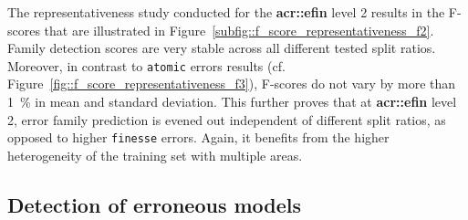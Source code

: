         The representativeness study conducted for the \textbf{\gls{acr::efin}} level 2 results in the F-scores that are illustrated in Figure~\ref{subfig::f_score_representativeness_f2}.
        Family detection scores are very stable across all different tested split ratios.
        Moreover, in contrast to \texttt{atomic} errors results (cf. Figure~\ref{fig::f_score_representativeness_f3}), F-scores do not vary by more than \SI{1}{\percent} in mean and standard deviation.
        This further proves that at \textbf{\gls{acr::efin}} level 2, error family prediction is evened out independent of different split ratios, as opposed to higher \texttt{finesse} errors.
        Again, it benefits from the higher heterogeneity of the training set with multiple areas.
    
    \subsection{Detection of erroneous models}
        \label{subsec::experiments::finesse::1}
